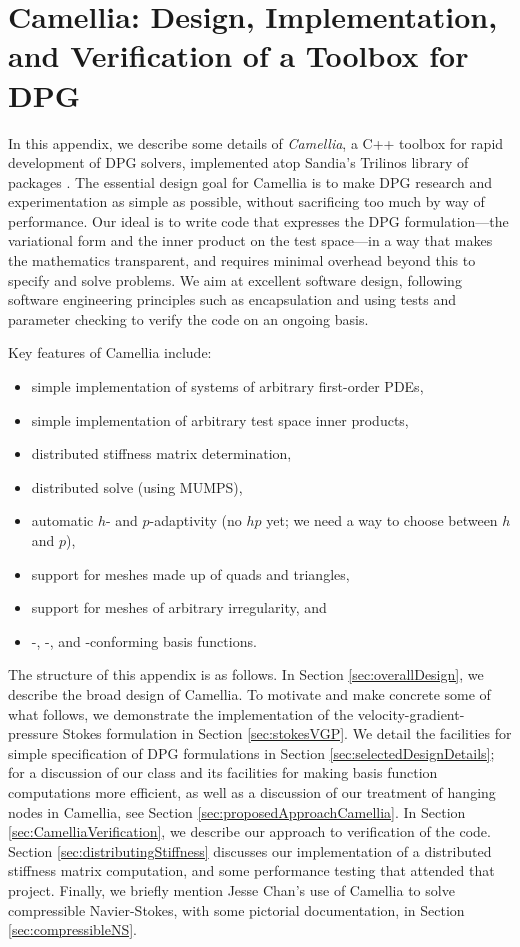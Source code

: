 \section{Camellia: Design, Implementation, and Verification of a Toolbox for DPG}
\label{sec:CamelliaDetails}

In this appendix, we describe some details of \emph{Camellia}, a C++ toolbox for rapid development of DPG solvers, implemented atop Sandia's Trilinos library of packages \cite{Trilinos}.  The essential design goal for Camellia is to make DPG research and experimentation as simple as possible, without sacrificing too much by way of performance.  Our ideal is to write code that expresses the DPG formulation---the variational form and the inner product on the test space---in a way that makes the mathematics transparent, and requires minimal overhead beyond this to specify and solve problems.  We aim at excellent software design, following software engineering principles such as encapsulation and using tests and parameter checking to verify the code on an ongoing basis.

Key features of Camellia include:
\begin{itemize}
\item simple implementation of systems of arbitrary first-order PDEs,
\item simple implementation of arbitrary test space inner products,
\item distributed stiffness matrix determination,
\item distributed solve (using MUMPS),
\item automatic $h$- and $p$-adaptivity (no $hp$ yet; we need a way to choose between $h$ and $p$),
\item support for meshes made up of quads and triangles,
\item support for meshes of arbitrary irregularity, and
\item \NVRHgrad-, \NVRHdiv-, and \NVRHcurl-conforming basis functions.
\end{itemize}

The structure of this appendix is as follows.  In Section \ref{sec:overallDesign}, we describe the broad design of Camellia.  To motivate and make concrete some of what follows, we demonstrate the implementation of the velocity-gradient-pressure Stokes formulation in Section \ref{sec:stokesVGP}.  We detail the facilities for simple specification of DPG formulations in Section \ref{sec:selectedDesignDetails}; for a discussion of our  class and its facilities for making basis function computations more efficient, as well as a discussion of our treatment of hanging nodes in Camellia, see Section \ref{sec:proposedApproachCamellia}.  In Section \ref{sec:CamelliaVerification}, we describe our approach to verification of the code.  Section \ref{sec:distributingStiffness} discusses our implementation of a distributed stiffness matrix computation, and some performance testing that attended that project.  Finally, we briefly mention Jesse Chan's use of Camellia to solve compressible Navier-Stokes, with some pictorial documentation, in Section \ref{sec:compressibleNS}.

